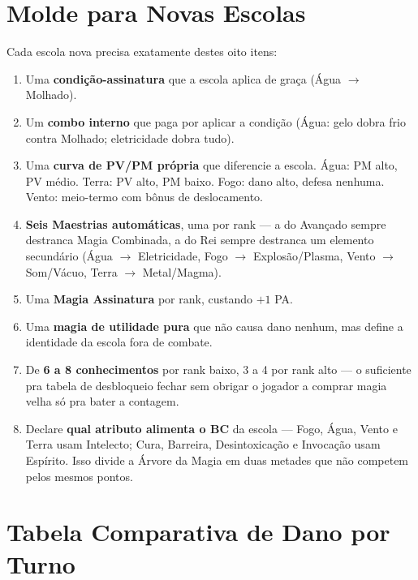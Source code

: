 \chapter{Molde para Novas Escolas}

Cada escola nova precisa exatamente destes oito itens:

\begin{enumerate}
    \item Uma \textbf{condição-assinatura} que a escola aplica de graça (Água $\to$ Molhado).
    \item Um \textbf{combo interno} que paga por aplicar a condição (Água: gelo dobra frio
          contra Molhado; eletricidade dobra tudo).
    \item Uma \textbf{curva de PV/PM própria} que diferencie a escola. Água: PM alto, PV
          médio. Terra: PV alto, PM baixo. Fogo: dano alto, defesa nenhuma. Vento:
          meio-termo com bônus de deslocamento.
    \item \textbf{Seis Maestrias automáticas}, uma por rank --- a do Avançado sempre destranca
          Magia Combinada, a do Rei sempre destranca um elemento secundário (Água $\to$
          Eletricidade, Fogo $\to$ Explosão/Plasma, Vento $\to$ Som/Vácuo, Terra $\to$
          Metal/Magma).
    \item Uma \textbf{Magia Assinatura \assinatura} por rank, custando $+1$ PA.
    \item Uma \textbf{magia de utilidade pura} que não causa dano nenhum, mas define a
          identidade da escola fora de combate.
    \item De \textbf{6 a 8 conhecimentos} por rank baixo, 3 a 4 por rank alto --- o suficiente
          pra tabela de desbloqueio fechar sem obrigar o jogador a comprar magia velha só pra
          bater a contagem.
    \item Declare \textbf{qual atributo alimenta o BC} da escola --- Fogo, Água, Vento e Terra
          usam Intelecto; Cura, Barreira, Desintoxicação e Invocação usam Espírito. Isso
          divide a Árvore da Magia em duas metades que não competem pelos mesmos pontos.
\end{enumerate}

\chapter{Tabela Comparativa de Dano por Turno}

